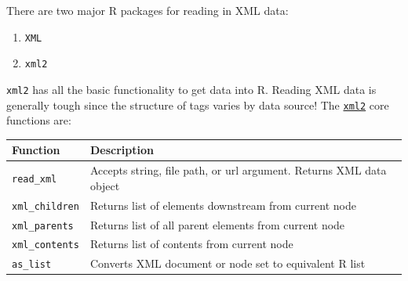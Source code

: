 \documentclass[
]{book}
\theoremstyle{definition}
\theoremstyle{definition}
\theoremstyle{definition}
\theoremstyle{remark}
\begin{document}
There are two major R packages for reading in XML data:

\begin{enumerate}
\def\labelenumi{\arabic{enumi}.}
\item
  \texttt{XML}
\item
  \texttt{xml2}
\end{enumerate}

\texttt{xml2} has all the basic functionality to get data into R. Reading XML data is generally tough since the structure of tags varies by data source! The \href{https://cran.r-project.org/web/packages/xml2/index.html}{\texttt{xml2}} core functions are:

\begin{longtable}[]{@{}ll@{}}
\toprule
\begin{minipage}[b]{0.22\columnwidth}\raggedright
Function\strut
\end{minipage} & \begin{minipage}[b]{0.72\columnwidth}\raggedright
Description\strut
\end{minipage}\tabularnewline
\midrule
\endhead
\begin{minipage}[t]{0.22\columnwidth}\raggedright
\texttt{read\_xml}\strut
\end{minipage} & \begin{minipage}[t]{0.72\columnwidth}\raggedright
Accepts string, file path, or url argument. Returns XML data object\strut
\end{minipage}\tabularnewline
\begin{minipage}[t]{0.22\columnwidth}\raggedright
\texttt{xml\_children}\strut
\end{minipage} & \begin{minipage}[t]{0.72\columnwidth}\raggedright
Returns list of elements downstream from current node\strut
\end{minipage}\tabularnewline
\begin{minipage}[t]{0.22\columnwidth}\raggedright
\texttt{xml\_parents}\strut
\end{minipage} & \begin{minipage}[t]{0.72\columnwidth}\raggedright
Returns list of all parent elements from current node\strut
\end{minipage}\tabularnewline
\begin{minipage}[t]{0.22\columnwidth}\raggedright
\texttt{xml\_contents}\strut
\end{minipage} & \begin{minipage}[t]{0.72\columnwidth}\raggedright
Returns list of contents from current node\strut
\end{minipage}\tabularnewline
\begin{minipage}[t]{0.22\columnwidth}\raggedright
\texttt{as\_list}\strut
\end{minipage} & \begin{minipage}[t]{0.72\columnwidth}\raggedright
Converts XML document or node set to equivalent R list\strut
\end{minipage}\tabularnewline
\bottomrule
\end{longtable}
\end{document}
